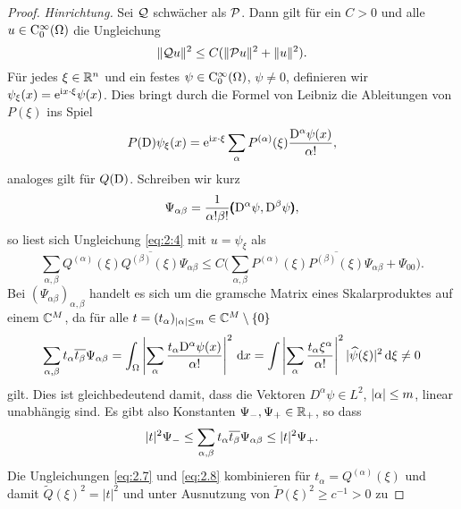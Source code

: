 \begin{proof}
{\em Hinrichtung.}
Sei $\mathcal Q$ schwächer als $\mathcal P$.
Dann gilt für ein $C>0$ und alle $u\in\mathrm C_0^\infty(\Omega)$ die Ungleichung
\begin{equation}\label{eq:2:4}
\lVert\mathcal Q u\rVert^2\leq C(\lVert\mathcal P u\rVert^2+\lVert u\rVert^2).
\end{equation}
Für jedes $\xi\in\mathbb R^n$ und ein festes $\psi\in \mathrm C^\infty_0(\Omega)$, $\psi\neq0$,
definieren wir $\psi_\xi(x)=\mathrm e^{\mathrm i x\cdot\xi}\psi(x)$.
Dies bringt durch die Formel von Leibniz die Ableitungen von $P(\xi)$ ins Spiel
\begin{equation}\label{eq:2.5}
P(\mathrm D)\psi_\xi(x)=\mathrm e^{\mathrm i x\cdot\xi}\sum_\alpha P^{(\alpha)}(\xi)\frac{\mathrm D^\alpha\psi(x)}{\alpha!},
\end{equation}
analoges gilt für $Q(\mathrm D)$.
Schreiben wir kurz
\begin{equation}\label{eq:2.6}
\Psi_{\alpha\beta}=\frac1{\alpha!\beta!}\pmb(\mathrm D^\alpha\psi,\mathrm D^\beta\psi\pmb),
\end{equation}
so liest sich Ungleichung \eqref{eq:2:4} mit $u=\psi_\xi$ als
\begin{equation}\label{eq:2.7}
\sum_{\alpha,\beta}Q^{(\alpha)}(\xi)\overline{{Q}^{(\beta)}(\xi)}\Psi_{\alpha\beta}
\leq C\bigg(\sum_{\alpha,\beta}P^{(\alpha)}(\xi)\overline{{P}^{(\beta)}(\xi)}\Psi_{\alpha\beta}+\Psi_{00}\bigg).
\end{equation}
Bei $\left(\Psi_{\alpha\beta}\right)_{\alpha,\beta}$ handelt es sich um die gramsche Matrix
eines Skalarproduktes auf einem $\mathbb C^M$, da für alle $t=(t_\alpha)_{|\alpha|\le m}\in\mathbb C^M\setminus\{0\}$
\begin{equation}
  \sum_{\alpha,\beta} t_\alpha \overline{t_\beta} \Psi_{\alpha\beta} = \int_\Omega \left|\sum_\alpha \frac{t_\alpha \mathrm D^\alpha\psi (x)}{\alpha! }\right|^2 \,\mathrm d x 
  = \int \left|\sum_\alpha \frac{t_\alpha \xi^\alpha}{\alpha!} \right|^2 |\widehat\psi(\xi)|^2 \,\mathrm d\xi \ne0
\end{equation}
gilt.
Dies ist gleichbedeutend damit,
dass die Vektoren $D^\alpha\psi\in L^2$, $\lvert\alpha\rvert\leq m$, linear unabhängig sind.
Es gibt also Konstanten $\Psi_-,\Psi_+\in\mathbb R_+$, so dass
\begin{equation}\label{eq:2.8}
\lvert t\rvert^2\Psi_-\leq\sum_{\alpha,\beta}t_\alpha \overline{t_\beta}\Psi_{\alpha\beta}\leq\lvert t\rvert^2\Psi_+.
\end{equation}
Die Ungleichungen \eqref{eq:2.7} und \eqref{eq:2.8} kombinieren für $t_\alpha=Q^{(\alpha)}(\xi)$ und damit $\widetilde Q(\xi)^2=|t|^2$ 
und unter Ausnutzung von $\widetilde P(\xi)^2\ge c^{-1}>0$ zu

\end{proof}
